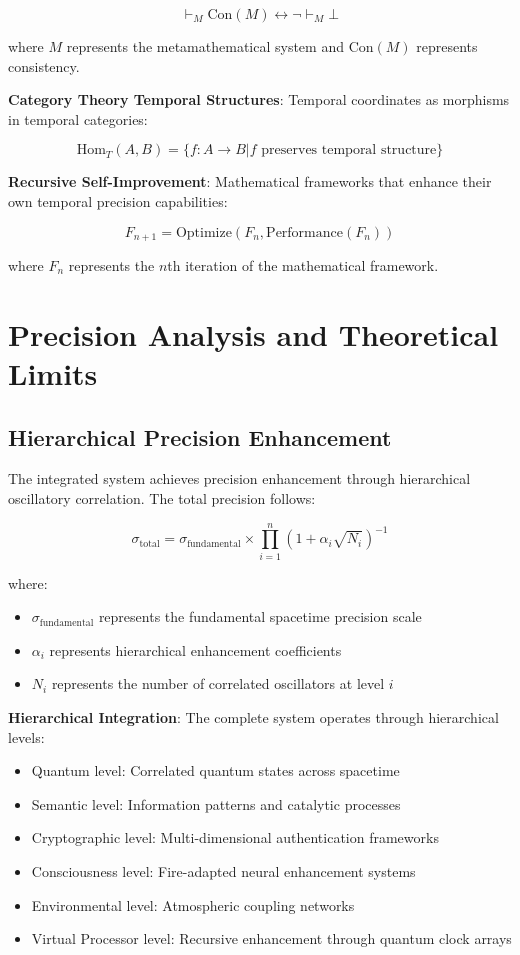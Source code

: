 \documentclass[11pt]{article}
\theoremstyle{remark}
\begin{document}
$$\vdash_M \text{Con}(M) \leftrightarrow \neg \vdash_M \bot$$

where $M$ represents the metamathematical system and $\text{Con}(M)$ represents consistency.

\textbf{Category Theory Temporal Structures}: Temporal coordinates as morphisms in temporal categories:

$$\text{Hom}_T(A,B) = \{f: A \to B | f \text{ preserves temporal structure}\}$$

\textbf{Recursive Self-Improvement}: Mathematical frameworks that enhance their own temporal precision capabilities:

$$F_{n+1} = \text{Optimize}(F_n, \text{Performance}(F_n))$$

where $F_n$ represents the $n$th iteration of the mathematical framework.

\section{Precision Analysis and Theoretical Limits}

\subsection{Hierarchical Precision Enhancement}

The integrated system achieves precision enhancement through hierarchical oscillatory correlation. The total precision follows:

$$\sigma_{\text{total}} = \sigma_{\text{fundamental}} \times \prod_{i=1}^{n}(1 + \alpha_i\sqrt{N_i})^{-1}$$

where:
\begin{itemize}
\item $\sigma_{\text{fundamental}}$ represents the fundamental spacetime precision scale
\item $\alpha_i$ represents hierarchical enhancement coefficients
\item $N_i$ represents the number of correlated oscillators at level $i$
\end{itemize}

\textbf{Hierarchical Integration}: The complete system operates through hierarchical levels:
\begin{itemize}
\item Quantum level: Correlated quantum states across spacetime
\item Semantic level: Information patterns and catalytic processes
\item Cryptographic level: Multi-dimensional authentication frameworks
\item Consciousness level: Fire-adapted neural enhancement systems
\item Environmental level: Atmospheric coupling networks
\item Virtual Processor level: Recursive enhancement through quantum clock arrays
\end{itemize}
\end{document}
